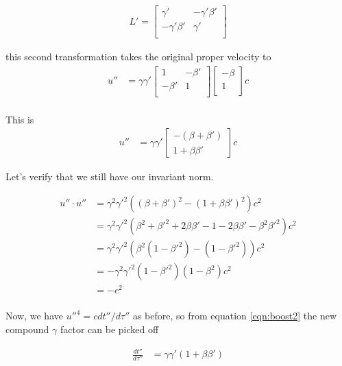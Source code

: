 \begin{align*}
L' =
\begin{bmatrix}
\gamma' & - \gamma' \beta' \\
- \gamma' \beta' & \gamma' \\
\end{bmatrix}
\end{align*}

this second transformation takes the original proper velocity to
\begin{align*}
u'' &=
\gamma \gamma'
\begin{bmatrix}
1 & - \beta' \\
- \beta' & 1 \\
\end{bmatrix}
\begin{bmatrix}
- \beta \\
1 \\
\end{bmatrix}
c \\
\end{align*}

This is
\begin{align}\label{eqn:boost2}
u'' &=
\gamma \gamma'
\begin{bmatrix}
-(\beta + \beta') \\
1 + \beta\beta'
\end{bmatrix}
c
\end{align}

Let's verify that we still have our invariant norm.

\begin{align*}
u'' \cdot u'' 
&=
\gamma^2 {\gamma'}^2
\left(
(\beta + \beta')^2 
-(1 + \beta\beta')^2
\right)
c^2 \\
&=
\gamma^2 {\gamma'}^2
\left(
\beta^2
+{\beta'}^2
+2 \beta\beta'
-1
-2 \beta\beta'
-\beta^2 {\beta'}^2
\right)
c^2 \\
&=
\gamma^2 {\gamma'}^2
\left(
\beta^2 (1 - {\beta'}^2)
-(1 -{\beta'}^2)
\right)
c^2 \\
&=
-\gamma^2 {\gamma'}^2 (1 -{\beta'}^2)(1 -\beta^2) c^2 \\
&=
- c^2 \\
\end{align*}

Now, we have ${u''}^4 = c dt''/d\tau''$ as before, so from equation
\ref{eqn:boost2} the new compound $\gamma$ factor can be picked off

\begin{align*}
\frac{dt''}{d\tau''} &=
\gamma \gamma'( 1 + \beta\beta' )
\end{align*}

